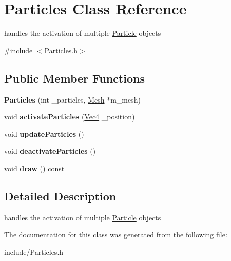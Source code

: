 \hypertarget{classParticles}{}\section{Particles Class Reference}
\label{classParticles}


handles the activation of multiple \hyperlink{classParticle}{Particle} objects  




{\ttfamily \#include $<$Particles.\+h$>$}

\subsection*{Public Member Functions}
\begin{DoxyCompactItemize}
\item 
{\bfseries Particles} (int \+\_\+particles, \hyperlink{classMesh}{Mesh} $\ast$m\+\_\+mesh)\hypertarget{classParticles_a72fe087ac7fb6d7af2903fb23deb2a6a}{}\label{classParticles_a72fe087ac7fb6d7af2903fb23deb2a6a}

\item 
void {\bfseries activate\+Particles} (\hyperlink{classVec4}{Vec4} \+\_\+position)\hypertarget{classParticles_a0e6a9f0d1d924e49c07d68206c88e2d4}{}\label{classParticles_a0e6a9f0d1d924e49c07d68206c88e2d4}

\item 
void {\bfseries update\+Particles} ()\hypertarget{classParticles_a0c796972d3b457121398ee9168363d1b}{}\label{classParticles_a0c796972d3b457121398ee9168363d1b}

\item 
void {\bfseries deactivate\+Particles} ()\hypertarget{classParticles_ad97778a640cfdf54fe67ec3abdaaad74}{}\label{classParticles_ad97778a640cfdf54fe67ec3abdaaad74}

\item 
void {\bfseries draw} () const \hypertarget{classParticles_aaf59f31d8ef8135350b87bf0f173c7a1}{}\label{classParticles_aaf59f31d8ef8135350b87bf0f173c7a1}

\end{DoxyCompactItemize}


\subsection{Detailed Description}
handles the activation of multiple \hyperlink{classParticle}{Particle} objects 

The documentation for this class was generated from the following file\+:\begin{DoxyCompactItemize}
\item 
include/Particles.\+h\end{DoxyCompactItemize}

